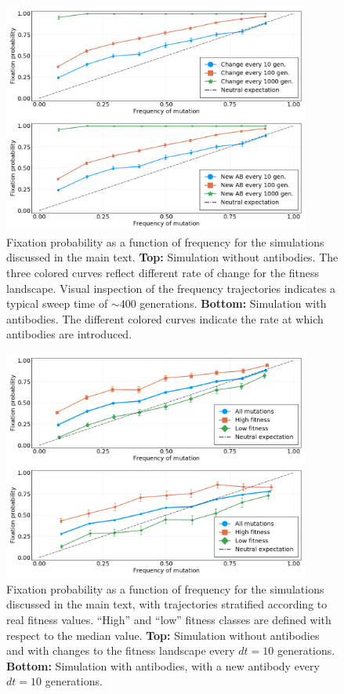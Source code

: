 \documentclass[reprint,amsmath,amssymb,superscriptaddress,showpacs,rmp]{revtex4-1}
\begin{document}
	\begin{figure}
		\centering
		\includegraphics[width=0.9\textwidth]{SM_figures/simulation.png}
		\caption{Fixation probability as a function of frequency for the simulations discussed in the main text. \textbf{Top:} Simulation without antibodies. The three colored curves reflect different rate of change for the fitness landscape. Visual inspection of the frequency trajectories indicates a typical sweep time of $\sim400$ generations. \textbf{Bottom:} Simulation with antibodies. The different colored curves indicate the rate at which antibodies are introduced. }
		\label{fig:simulations}
	\end{figure}

	\begin{figure}
		\centering
		\includegraphics[width=0.9\textwidth]{SM_figures/simulation_fitness.png}
		\caption{Fixation probability as a function of frequency for the simulations discussed in the main text, with trajectories stratified according to real fitness values. ``High'' and ``low'' fitness classes are defined with respect to the median value. \textbf{Top:} Simulation without antibodies and with changes to the fitness landscape every $dt=10$ generations. \textbf{Bottom:} Simulation with antibodies, with a new antibody every $dt=10$ generations. }
		\label{fig:simulations_fitness}
	\end{figure}



\end{document}
